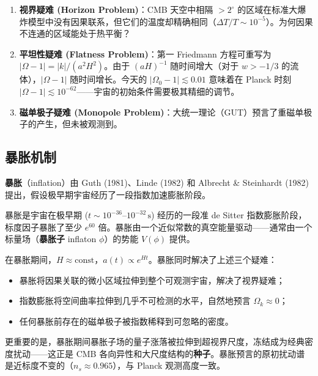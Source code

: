 \begin{enumerate}
    \item \textbf{视界疑难 (Horizon Problem)}：CMB 天空中相隔 $> 2^\circ$ 的区域在标准大爆炸模型中没有因果联系，但它们的温度却精确相同（$\Delta T/T \sim 10^{-5}$）。为何因果不连通的区域能处于热平衡？

    \item \textbf{平坦性疑难 (Flatness Problem)}：第一 Friedmann 方程可重写为 $|\Omega - 1| = |k|/(a^2 H^2)$。由于 $(aH)^{-1}$ 随时间增大（对于 $w > -1/3$ 的流体），$|\Omega - 1|$ 随时间增长。今天的 $|\Omega_0 - 1| \lesssim 0.01$ 意味着在 Planck 时刻 $|\Omega - 1| \lesssim 10^{-62}$——宇宙的初始条件需要极其精细的调节。

    \item \textbf{磁单极子疑难 (Monopole Problem)}：大统一理论（GUT）预言了重磁单极子的产生，但未被观测到。
\end{enumerate}

\subsection{暴胀机制}

\textbf{暴胀}（inflation）由 Guth (1981)、Linde (1982) 和 Albrecht \& Steinhardt (1982) 提出，假设极早期宇宙经历了一段指数加速膨胀阶段。

\begin{definition}[暴胀]
暴胀是宇宙在极早期 ($t \sim 10^{-36}$--$10^{-32}\,\text{s}$) 经历的一段准 de Sitter 指数膨胀阶段，标度因子暴胀了至少 $e^{60}$ 倍。暴胀由一个近似常数的真空能量驱动——通常由一个标量场（\textbf{暴胀子} inflaton $\phi$）的势能 $V(\phi)$ 提供。
\end{definition}

在暴胀期间，$H \approx \text{const}$，$a(t) \propto e^{Ht}$。暴胀同时解决了上述三个疑难：
\begin{itemize}
    \item 暴胀将因果关联的微小区域拉伸到整个可观测宇宙，解决了视界疑难；
    \item 指数膨胀将空间曲率拉伸到几乎不可检测的水平，自然地预言 $\Omega_k \approx 0$；
    \item 任何暴胀前存在的磁单极子被指数稀释到可忽略的密度。
\end{itemize}

更重要的是，暴胀期间暴胀子场的量子涨落被拉伸到超视界尺度，冻结成为经典密度扰动——这正是 CMB 各向异性和大尺度结构的\textbf{种子}。暴胀预言的原初扰动谱是近标度不变的（$n_s \approx 0.965$），与 Planck 观测高度一致。

